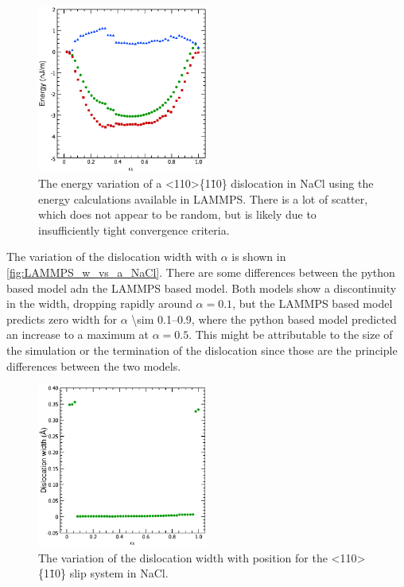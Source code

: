 \begin{figure}
\centering
\includegraphics[width=0.5\textwidth]{NaCl_110_110_U_vs_alpha_LAMMPS}
\caption{The energy variation of a <110>\{1\={1}0\} dislocation in NaCl using the energy calculations available in LAMMPS. There is a lot of scatter, which does not appear to be random, but is likely due to insufficiently tight convergence criteria.\label{fig:NaCl_110_110_U_vs_a_LAMMPS}}
\end{figure}

The variation of the dislocation width with $\alpha$ is shown in \autoref{fig:LAMMPS_w_vs_a_NaCl}. There are some differences between the python based model adn the LAMMPS based model. Both models show a discontinuity in the width, dropping rapidly around $\alpha=0.1$, but the LAMMPS based model predicts zero width for $\alpha$ \numrange{\sim 0.1}{ 0.9}, where the python based model predicted an increase to a maximum at $\alpha=0.5$. This might be attributable to the size of the simulation or the termination of the dislocation since those are the principle differences between the two models.

\begin{figure}
\centering
\includegraphics[width=0.5\textwidth]{NaCl_110_110_w_vs_a_LAMMPS}
\caption{The variation of the dislocation width with position for the <110>\{1\={1}0\} slip system in NaCl.\label{fig:LAMMPS_w_vs_a_NaCl}}
\end{figure}




